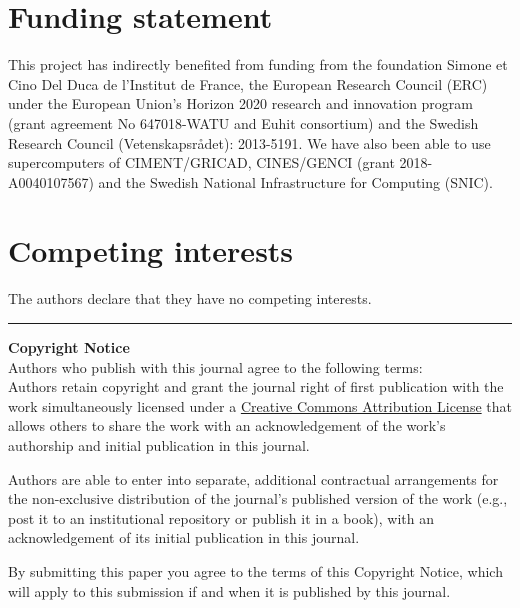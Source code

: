 \section{Funding statement}


This project has indirectly benefited from funding from the foundation Simone et
Cino Del Duca de l'Institut de France, the European Research Council (ERC)
under the European Union's Horizon 2020 research and innovation program (grant
agreement No 647018-WATU and Euhit consortium) and the Swedish Research Council
(Vetenskapsr{\aa}det): 2013-5191.
%
We have also been able to use supercomputers of CIMENT/GRICAD, CINES/GENCI
(grant 2018-A0040107567) and the Swedish National Infrastructure for Computing
(SNIC).

\section{Competing interests}

The authors declare that they have no competing interests.


%


\rule{\textwidth}{1pt}

{\bf Copyright Notice} \\
Authors who publish with this journal agree to the following terms: \\

Authors retain copyright and grant the journal right of first publication with
the work simultaneously licensed under a
\href{http://creativecommons.org/licenses/by/3.0/}{Creative Commons Attribution
License} that allows others to share the work with an acknowledgement of the
work's authorship and initial publication in this journal.

Authors are able to enter into separate, additional contractual arrangements
for the non-exclusive distribution of the journal's published version of the
work (e.g., post it to an institutional repository or publish it in a book),
with an acknowledgement of its initial publication in this journal.

By submitting this paper you agree to the terms of this Copyright Notice, which
will apply to this submission if and when it is published by this journal.

